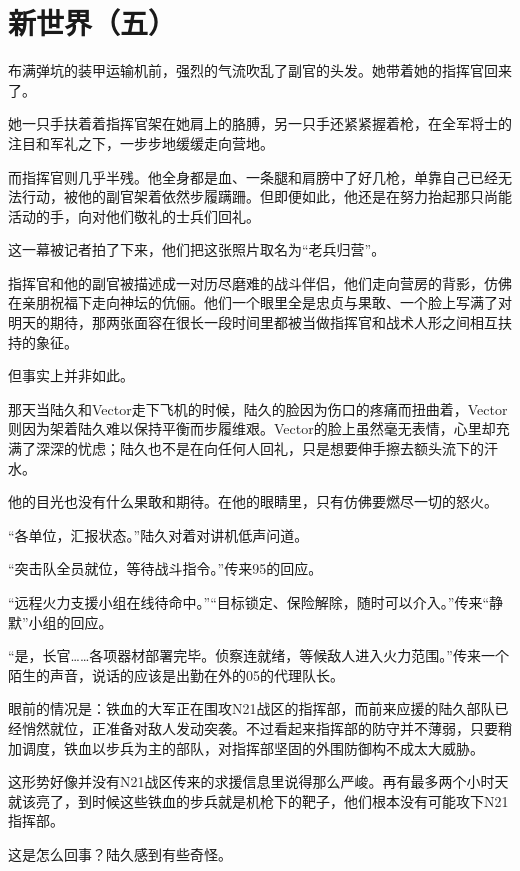 \chapter{新世界（五）}


\begin{QuoteEnv}[85 Evo]{}
布满弹坑的装甲运输机前，强烈的气流吹乱了副官的头发。她带着她的指挥官回来了。

她一只手扶着着指挥官架在她肩上的胳膊，另一只手还紧紧握着枪，在全军将士的注目和军礼之下，一步步地缓缓走向营地。

而指挥官则几乎半残。他全身都是血、一条腿和肩膀中了好几枪，单靠自己已经无法行动，被他的副官架着依然步履蹒跚。但即便如此，他还是在努力抬起那只尚能活动的手，向对他们敬礼的士兵们回礼。

这一幕被记者拍了下来，他们把这张照片取名为“老兵归营”。

指挥官和他的副官被描述成一对历尽磨难的战斗伴侣，他们走向营房的背影，仿佛在亲朋祝福下走向神坛的伉俪。他们一个眼里全是忠贞与果敢、一个脸上写满了对明天的期待，那两张面容在很长一段时间里都被当做指挥官和战术人形之间相互扶持的象征。

但事实上并非如此。

那天当陆久和Vector走下飞机的时候，陆久的脸因为伤口的疼痛而扭曲着，Vector则因为架着陆久难以保持平衡而步履维艰。Vector的脸上虽然毫无表情，心里却充满了深深的忧虑；陆久也不是在向任何人回礼，只是想要伸手擦去额头流下的汗水。

他的目光也没有什么果敢和期待。在他的眼睛里，只有仿佛要燃尽一切的怒火。
\end{QuoteEnv}




“各单位，汇报状态。”陆久对着对讲机低声问道。

“突击队全员就位，等待战斗指令。”传来95的回应。

“远程火力支援小组在线待命中。”“目标锁定、保险解除，随时可以介入。”传来“静默”小组的回应。

“是，长官……各项器材部署完毕。侦察连就绪，等候敌人进入火力范围。”传来一个陌生的声音，说话的应该是出勤在外的05的代理队长。

眼前的情况是：铁血的大军正在围攻N21战区的指挥部，而前来应援的陆久部队已经悄然就位，正准备对敌人发动突袭。不过看起来指挥部的防守并不薄弱，只要稍加调度，铁血以步兵为主的部队，对指挥部坚固的外围防御构不成太大威胁。

这形势好像并没有N21战区传来的求援信息里说得那么严峻。再有最多两个小时天就该亮了，到时候这些铁血的步兵就是机枪下的靶子，他们根本没有可能攻下N21指挥部。

这是怎么回事？陆久感到有些奇怪。

